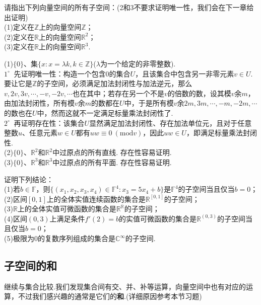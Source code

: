 \documentclass[lang=cn, zihao=5]{elegantbook}
\newcommand{\R}{\mathbb{R}}
\newcommand{\C}{\mathbb{C}}
\newcommand{\F}{\mathbb{F}}
\newcommand{\buzhou}[1]{$#1^{\circ} \ $}
\begin{document}
\begin{example}
    请指出下列向量空间的所有子空间：(2和3不要求证明唯一性，我们会在下一章给出证明) \\
    (1)定义在$\mathbb{Z}$上的向量空间$\mathbb{Z}$； \\
    (2)定义在$\R$上的向量空间$\R ^{2}$； \\
    (3)定义在$\R$上的向量空间$\R ^{3}$.
\end{example}
\begin{solution}
    (1)$\{ 0 \}$、集$\{ x : x=\lambda k,k \in \mathbb{Z} \}$($\lambda$为一个给定的非零整数). \\
    \buzhou{1} 先证明唯一性：构造一个包含$0$的集合$U$，且该集合中包含另一非零元素$v \in U$.要让它是$\mathbb{Z}$的子空间，必须满足加法封闭性与加法逆元，那么$v,2v,3v,\cdots ,-v,-2v,\cdots$也在其中；若存在另一个不是$v$的倍数的数，设其模$v$余$m$，由加法封闭性，所有模$v$余$m$的数都在$U$中，于是所有模$v$余$2m,3m, \cdots , -m,-2m,\cdots$的数也在$U$中，然而这就不一定满足标量乘法封闭性了. \\
    \buzhou{2} 再证明存在性：该集合$U$显然满足加法封闭性、存在加法单位元，且对于任意整数$u$、任意元素$w \in U$都有$uw \equiv 0 ~(\text{mod} v)$，因此$uw \in U$，即满足标量乘法封闭性. \\
    (2)$\{ 0 \}$、$\R ^2$和$\R ^2$中过原点的所有直线. 存在性容易证明. \\
    (3)$\{ 0 \}$、$\R ^3$和$\R ^3$中过原点的所有平面. 存在性容易证明.
\end{solution}

\begin{example}
    证明下列结论：\\
    (1)若$b \in \F$，则$\{ (x_1,x_2,x_3,x_4) \in \F ^{4} : x_3 = 5x_4+b \}$是$\F ^{4}$的子空间当且仅当$b=0$； \\
    (2)区间$[0,1]$上的全体实值连续函数的集合是$\R ^{[0,1]}$的子空间； \\
    (3)$\R$上的全体实值可微函数的集合是$\R ^{\R}$的子空间； \\
    (4)区间$(0,3)$上满足条件$f'(2)=b$的实值可微函数的集合是$\R ^{(0,3)}$的子空间当且仅当$b=0$； \\
    (5)极限为$0$的复数序列组成的集合是$\C ^{\infty}$的子空间.
\end{example}

\subsection{子空间的和}

继续与集合比较.我们发现集合间有交、并、补等运算，向量空间中也有对应的运算，不过我们感兴趣的通常是它们的\textbf{和}.(详细原因参考本节习题)
\end{document}
